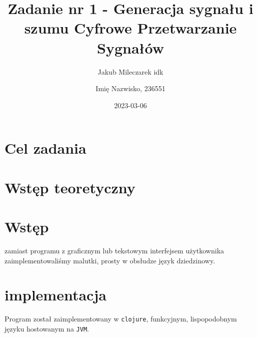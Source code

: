 \documentclass[12pt]{article}
\title{{\bf Zadanie nr 1 - Generacja sygnału i szumu}\linebreak
	Cyfrowe Przetwarzanie Sygnałów}
\author{Jakub Mileczarek idk \and Imię Nazwisko, 236551}
\date{2023-03-06} %
\newcommand{\BibTeX}{{\sc Bib}\TeX}
\begin{document}
\clearpage\maketitle
\thispagestyle{empty}
\newpage
\setcounter{page}{1}
\section{Cel zadania}



\section{Wstęp teoretyczny}


\section{Wstęp}
zamiast programu z graficznym lub tekstowym interfejsem użytkownika zaimplementowaliśmy malutki, prosty w obsłudze język dziedzinowy.

\section{implementacja}
Program został zaimplementowany w \texttt{clojure}, funkcyjnym, lispopodobnym języku hostowanym na \texttt{JVM}.
\end{document}
